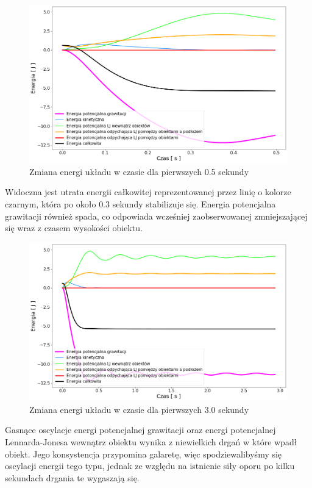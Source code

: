 \documentclass[12pt, letterpaper]{report}
\begin{document}
    \begin{figure}[H]
        \centering
        \includegraphics[width=14cm]{pressure_energy_01}
        \caption{
            Zmiana energi układu w czasie dla pierwszych 0.5 sekundy
        }
    \end{figure}

    Widoczna jest utrata energii całkowitej reprezentowanej przez linię o kolorze czarnym, która po około $0.3$ sekundy
    stabilizuje się. Energia potencjalna grawitacji również spada, co odpowiada wcześniej zaobserwowanej 
    zmniejszającej się wraz z czasem wysokości obiektu.

    \begin{figure}[H]
        \centering
        \includegraphics[width=14cm]{pressure_energy_02.png}
        \caption{
            Zmiana energi układu w czasie dla pierwszych 3.0 sekundy
        }
    \end{figure}

    Gasnące oscylacje energi potencjalnej grawitacji oraz energi potencjalnej Lennarda-Jonesa wewnątrz obiektu
    wynika z niewielkich drgań w które wpadł obiekt. Jego konsystencja przypomina galaretę, więc spodziewalibyśmy się
    oscylacji energii tego typu, jednak ze względu na istnienie siły oporu po kilku sekundach drgania te wygaszają się.
\end{document}
